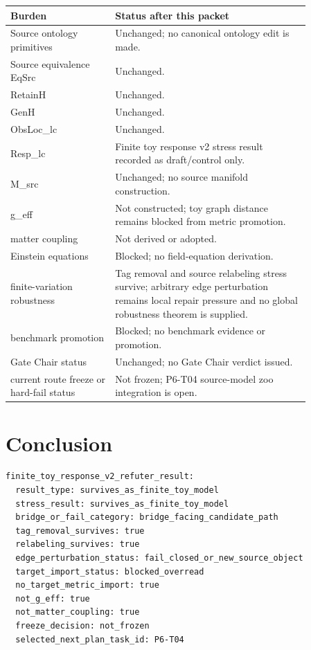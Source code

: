 \documentclass[11pt]{article}
\begin{document}
\begin{longtable}{p{0.30\linewidth}p{0.56\linewidth}}
\toprule
Burden & Status after this packet \\
\midrule
Source ontology primitives & Unchanged; no canonical ontology edit is made. \\
Source equivalence EqSrc & Unchanged. \\
RetainH & Unchanged. \\
GenH & Unchanged. \\
ObsLoc\_lc & Unchanged. \\
Resp\_lc & Finite toy response v2 stress result recorded as draft/control only. \\
M\_src & Unchanged; no source manifold construction. \\
g\_eff & Not constructed; toy graph distance remains blocked from metric promotion. \\
matter coupling & Not derived or adopted. \\
Einstein equations & Blocked; no field-equation derivation. \\
finite-variation robustness & Tag removal and source relabeling stress survive; arbitrary edge perturbation remains local repair pressure and no global robustness theorem is supplied. \\
benchmark promotion & Blocked; no benchmark evidence or promotion. \\
Gate Chair status & Unchanged; no Gate Chair verdict issued. \\
current route freeze or hard-fail status & Not frozen; P6-T04 source-model zoo integration is open. \\
\bottomrule
\end{longtable}

\section{Conclusion}

\begin{verbatim}
finite_toy_response_v2_refuter_result:
  result_type: survives_as_finite_toy_model
  stress_result: survives_as_finite_toy_model
  bridge_or_fail_category: bridge_facing_candidate_path
  tag_removal_survives: true
  relabeling_survives: true
  edge_perturbation_status: fail_closed_or_new_source_object
  target_import_status: blocked_overread
  no_target_metric_import: true
  not_g_eff: true
  not_matter_coupling: true
  freeze_decision: not_frozen
  selected_next_plan_task_id: P6-T04
\end{verbatim}
\end{document}
